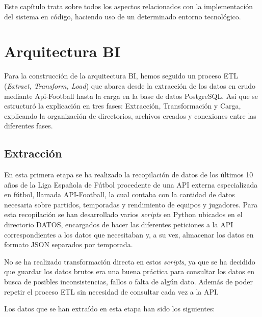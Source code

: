 

Este capítulo trata sobre todos los aspectos relacionados con la implementación del sistema en código, haciendo uso de un determinado entorno tecnológico.



\section{Arquitectura BI}
Para la construcción de la arquitectura BI, hemos seguido un proceso ETL (\textit{Extract, Transform, Load}) que abarca desde la extracción de los datos en crudo mediante Api-Football hasta la carga en la base de datos PostgreSQL. Así que se estructuró la explicación en tres fases: Extracción, Transformación y Carga, explicando la organización de directorios, archivos creados y conexiones entre las diferentes fases.
\subsection{Extracción}

En esta primera etapa se ha realizado la recopilación de datos de los últimos 10 años de la Liga Española de Fútbol procedente de una API externa especializada en fútbol, llamada API-Football, la cual contaba con la cantidad de datos necesaria sobre partidos, temporadas y rendimiento de equipos y jugadores. Para esta recopilación se han desarrollado varios \textit{scripts} en Python ubicados en el directorio DATOS, encargados de hacer las diferentes peticiones a la API correspondientes a los datos que necesitaban y, a su vez, almacenar los datos en formato JSON separados por temporada.

No se ha realizado transformación directa en estos \textit{scripts}, ya que se ha decidido que guardar los datos brutos era una buena práctica para consultar los datos en busca de posibles inconsistencias, fallos o falta de algún dato. Además de poder repetir el proceso ETL sin necesidad de consultar cada vez a la API.

Los datos que se han extraído en esta etapa han sido los siguientes:

